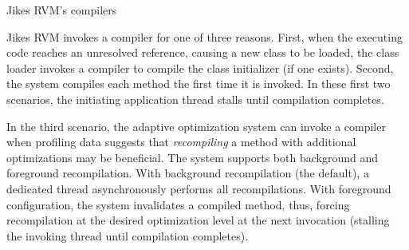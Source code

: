 \begin{section}{Jikes RVM's compilers}
\label{sec:jikesrvmscompilers}

Jikes RVM invokes a compiler for one of three reasons. First, when the executing code reaches an unresolved reference, causing a new
class to be loaded, the class loader invokes a compiler to compile the class initializer (if one exists). Second, the system compiles each method the first time it is invoked. In these first two scenarios, the initiating application thread stalls until compilation completes.

In the third scenario, the adaptive optimization system can invoke a compiler when profiling data suggests that \textit{recompiling} a method with additional optimizations may be beneficial. The system supports both background and foreground recompilation. With background recompilation (the default), a dedicated thread asynchronously performs all recompilations.  With foreground configuration, the system invalidates a compiled method, thus, forcing recompilation at the desired optimization level at the next invocation (stalling the invoking thread until compilation completes).


\end{section}
